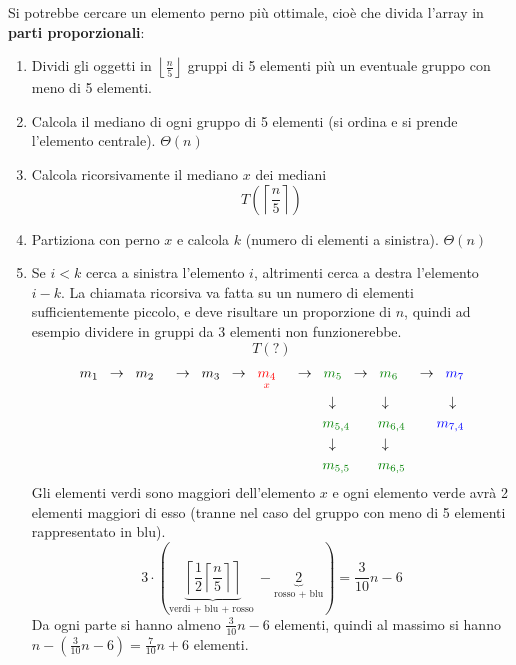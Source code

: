 \documentclass[a4paper]{article}
\begin{document}
Si potrebbe cercare un elemento perno più ottimale, cioè che divida l'array in
\textbf{parti proporzionali}:
\begin{enumerate}
  \item Dividi gli oggetti in \( \left\lfloor \frac{n}{5} \right\rfloor \) gruppi di
    5 elementi più un eventuale gruppo con meno di 5 elementi.

  \item Calcola il mediano di ogni gruppo di 5 elementi (si ordina e si prende l'elemento
    centrale). \( \Theta(n) \)

  \item Calcola ricorsivamente il mediano \( x \) dei mediani
    \[
      T\left(\left\lceil \frac{n}{5} \right\rceil\right)
    \]

  \item Partiziona con perno \( x \) e calcola \( k \) (numero di elementi a sinistra).
    \( \Theta (n) \)

  \item Se \( i<k \) cerca a sinistra l'elemento \( i \), altrimenti cerca a destra
    l'elemento \( i-k \). La chiamata ricorsiva va fatta su un numero di elementi
    sufficientemente piccolo, e deve risultare un proporzione di \( n \), quindi
    ad esempio dividere in gruppi da 3 elementi non funzionerebbe.
    \[
    T(?)
    \]
    \[
      \begin{aligned}
        m_1 \;\;&\to\;\; m_2 \;\;&\to\;\; m_3 \;\;&\to\;\; \color{red}\underset{x}{m_4} \;\;&\to\;\; \color{green!50!black}m_5
        \;\;&\to\;\; \color{green!50!black}m_6 \;\;&\to\;\; \color{blue}m_7\\
             &&&& \downarrow \quad&\qquad \downarrow &\downarrow \;\;\\
             &&&& \color{green!50!black}m_{5,4} &\qquad \color{green!50!black}m_{6,4} & \color{blue}m_{7,4} \\
             &&&& \downarrow \quad&\qquad \downarrow &\\
             &&&& \color{green!50!black}m_{5,5} &\qquad \color{green!50!black}m_{6,5} & \\
      \end{aligned}
    \]
    Gli elementi verdi sono maggiori dell'elemento \( x \) e ogni elemento verde avrà
    2 elementi maggiori di esso (tranne nel caso del gruppo con meno di 5 elementi
    rappresentato in blu).
    \[
      3 \cdot  \left(\underbrace{\left\lceil \frac{1}{2} \left\lceil \frac{n}{5} \right\rceil  \right\rceil}_{\text{
          verdi + blu + rosso
      }} - \underbrace{2}_{\text{rosso + blu}} \right)
      = \frac{3}{10} n - 6
    \]
    Da ogni parte si hanno almeno \( \frac{3}{10} n - 6 \) elementi, quindi
    al massimo si hanno \( n - \left( \frac{3}{10} n - 6 \right) = \frac{7}{10} n + 6 \)
    elementi.


\end{enumerate}
\end{document}
